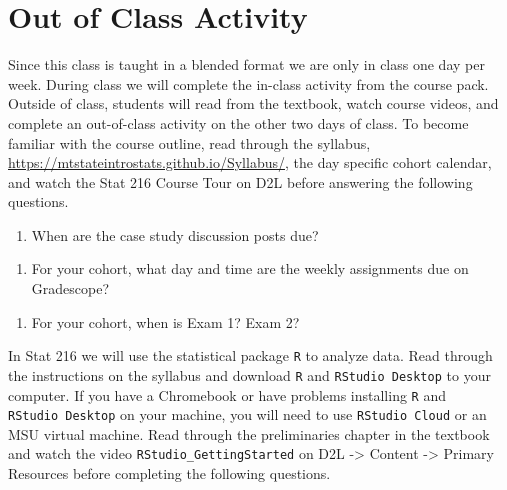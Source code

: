 \documentclass[
]{report}
\providecommand{\tightlist}{%
  \setlength{\itemsep}{0pt}\setlength{\parskip}{0pt}}
\begin{document}
\newpage

\hypertarget{out-of-class-activity}{%
\section{Out of Class Activity}\label{out-of-class-activity}}

Since this class is taught in a blended format we are only in class one day per week. During class we will complete the in-class activity from the course pack. Outside of class, students will read from the textbook, watch course videos, and complete an out-of-class activity on the other two days of class. To become familiar with the course outline, read through the syllabus, \url{https://mtstateintrostats.github.io/Syllabus/}, the day specific cohort calendar, and watch the Stat 216 Course Tour on D2L before answering the following questions.

\begin{enumerate}
\def\labelenumi{\arabic{enumi}.}
\tightlist
\item
  When are the case study discussion posts due?
\end{enumerate}

\vspace{0.3in}

\begin{enumerate}
\def\labelenumi{\arabic{enumi}.}
\setcounter{enumi}{1}
\tightlist
\item
  For your cohort, what day and time are the weekly assignments due on Gradescope?
\end{enumerate}

\vspace{0.3in}

\begin{enumerate}
\def\labelenumi{\arabic{enumi}.}
\setcounter{enumi}{2}
\tightlist
\item
  For your cohort, when is Exam 1? Exam 2?
\end{enumerate}

\vspace{0.3in}

In Stat 216 we will use the statistical package \texttt{R} to analyze data. Read through the instructions on the syllabus and download \texttt{R} and \texttt{RStudio\ Desktop} to your computer. If you have a Chromebook or have problems installing \texttt{R} and \texttt{RStudio\ Desktop} on your machine, you will need to use \texttt{RStudio\ Cloud} or an MSU virtual machine. Read through the preliminaries chapter in the textbook and watch the video \texttt{RStudio\_GettingStarted} on D2L -\textgreater{} Content -\textgreater{} Primary Resources before completing the following questions.
\end{document}
